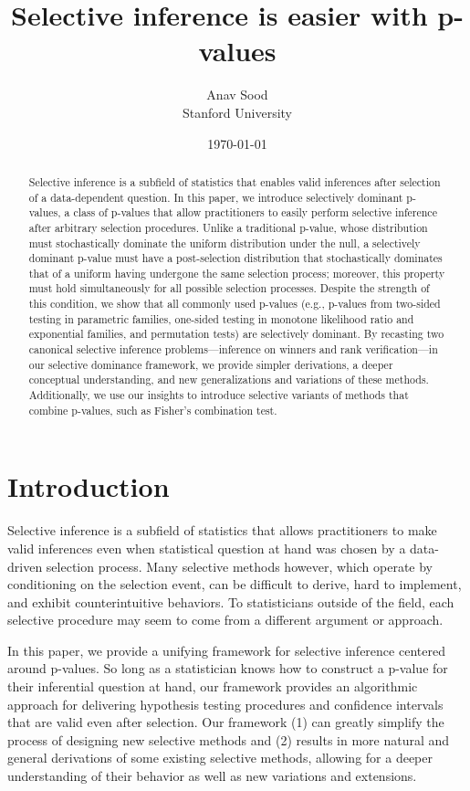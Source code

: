 \documentclass{article}
\title{Selective inference is easier with p-values}
\author{Anav Sood\\ Stanford University}
\date{\today}
\begin{document}
\maketitle

\begin{abstract}
Selective inference is a subfield of statistics that enables valid inferences after selection of a data-dependent question. In this paper, we introduce selectively dominant p-values, a class of p-values that allow practitioners to easily perform selective inference after arbitrary selection procedures. Unlike a traditional p-value, whose distribution must stochastically dominate the uniform distribution under the null, a selectively dominant p-value must have a  post-selection distribution that stochastically dominates that of a uniform having undergone the same selection process; moreover, this property must hold simultaneously for all possible selection processes. Despite the strength of this condition, we show that all commonly used p-values (e.g., p-values from two-sided testing in parametric families, one-sided testing in monotone likelihood ratio and exponential families, and permutation tests) are selectively dominant. By recasting two canonical selective inference problems—inference on winners and rank verification—in our selective dominance framework, we provide simpler derivations, a deeper conceptual understanding, and new generalizations and variations of these methods. Additionally, we use our insights to introduce selective variants of methods that combine p-values, such as Fisher's combination test. 
\end{abstract}


\section{Introduction}

Selective inference is a subfield of statistics that allows practitioners to make valid inferences even when statistical question at hand was chosen by a data-driven selection process. Many selective methods however, which operate by conditioning on the selection event, can be difficult to derive, hard to implement, and exhibit counterintuitive behaviors. To statisticians outside of the field, each selective procedure may seem to come from a different argument or approach.

In this paper, we provide a unifying framework for selective inference centered around p-values. So long as a statistician knows how to construct a p-value for their inferential question at hand, our framework provides an algorithmic approach for delivering hypothesis testing procedures and confidence intervals that are valid even after selection. Our framework (1) can greatly simplify the process of designing new selective methods and (2) results in more natural and general derivations of some existing selective methods, allowing for a deeper understanding of their behavior as well as new variations and extensions. 
\end{document}
